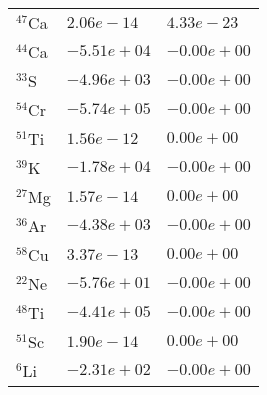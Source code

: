 \begin{tabular}{lll}
 $^{47}$Ca & $2.06e-14 $                                                        & $4.33e-23 $                                                                     \\
 $^{44}$Ca & $-5.51e+04 $                                                       & $-0.00e+00 $                                                                    \\
 $^{33}$S  & $-4.96e+03 $                                                       & $-0.00e+00 $                                                                    \\
 $^{54}$Cr & $-5.74e+05 $                                                       & $-0.00e+00 $                                                                    \\
 $^{51}$Ti & $1.56e-12 $                                                        & $0.00e+00 $                                                                     \\
 $^{39}$K  & $-1.78e+04 $                                                       & $-0.00e+00 $                                                                    \\
 $^{27}$Mg & $1.57e-14 $                                                        & $0.00e+00 $                                                                     \\
 $^{36}$Ar & $-4.38e+03 $                                                       & $-0.00e+00 $                                                                    \\
 $^{58}$Cu & $3.37e-13 $                                                        & $0.00e+00 $                                                                     \\
 $^{22}$Ne & $-5.76e+01 $                                                       & $-0.00e+00 $                                                                    \\
 $^{48}$Ti & $-4.41e+05 $                                                       & $-0.00e+00 $                                                                    \\
 $^{51}$Sc & $1.90e-14 $                                                        & $0.00e+00 $                                                                     \\
 $^{6}$Li  & $-2.31e+02 $                                                       & $-0.00e+00 $                                                                    \\

\end{tabular}
